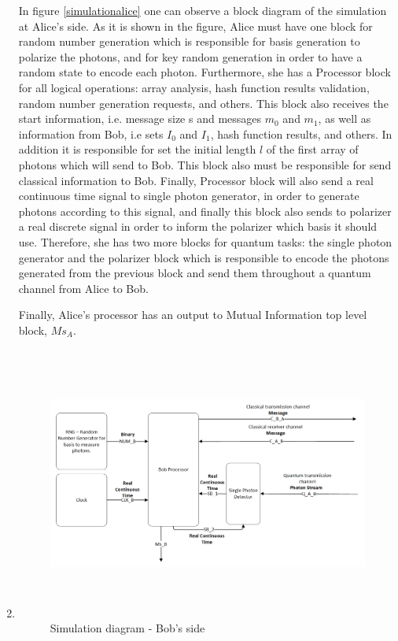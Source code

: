 \begin{enumerate}
    In figure \ref{simulationalice} one can observe a block diagram of the simulation at Alice's side. As it is shown in the figure, Alice must have one block for random number generation which is responsible for basis generation to polarize the photons, and for key random generation in order to have a random state to encode each photon. Furthermore, she has a Processor block for all logical operations: array analysis, hash function results validation, random number generation requests, and others. This block also receives the start information, i.e. message size s and messages $m_{0}$ and $m_{1}$, as well as information from Bob, i.e sets $I_{0}$ and $I_{1}$, hash function results, and others. In addition it is responsible for set the initial length $l$ of the first array of photons which will send to Bob. This block also must be responsible for send classical information to Bob. Finally, Processor block will also send a real continuous time signal to single photon generator, in order to generate photons according to this signal, and finally this block also sends to polarizer a real discrete signal in order to inform the polarizer which basis it should use. Therefore, she has two more blocks for quantum tasks: the single photon generator and the polarizer block which is responsible to encode the photons generated from the previous block and send them throughout a quantum channel from Alice to Bob.

    Finally, Alice's processor has an output to Mutual Information top level block, $Ms_{A}$.


  \item

  \begin{figure}[h]
	\centering
	\includegraphics[width=1.1\textwidth, height=9cm]{./sdf/qokd_with_discrete_variables/figures/Simulation_Bob.png}
	\caption{Simulation diagram - Bob's side}\label{simulationbob}
\end{figure}


\end{enumerate}

